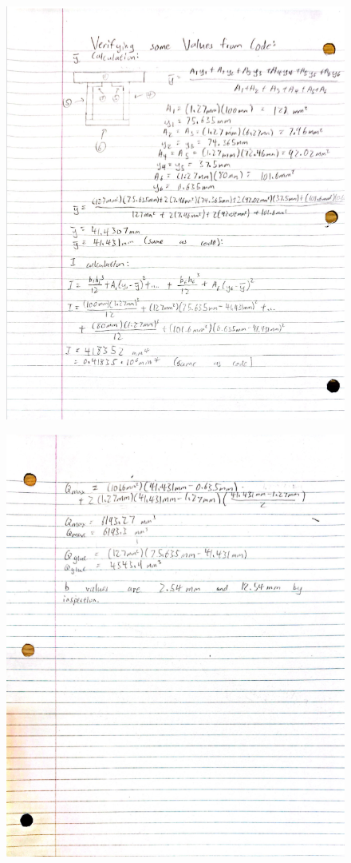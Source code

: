 \documentclass[11pt]{article}
\begin{document}
\begin{figure}[H]
    \centering
    \includegraphics[width=0.95\linewidth]{images/VerifyingCode.png}
\end{figure}

\begin{figure}[H]
    \centering
    \includegraphics[width=0.95\linewidth]{images/VerifyingCodeP2.png}
\end{figure}
\end{document}
